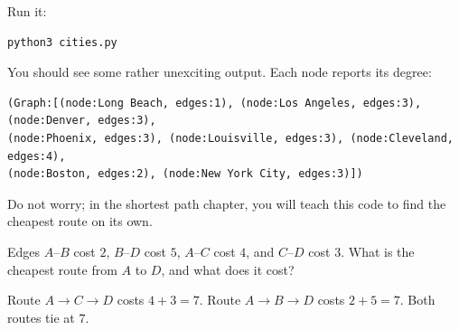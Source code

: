 Run it:
\begin{verbatim}
python3 cities.py
\end{verbatim}

You should see some rather unexciting output. Each node reports its
degree:

\begin{verbatim}
(Graph:[(node:Long Beach, edges:1), (node:Los Angeles, edges:3), (node:Denver, edges:3),
(node:Phoenix, edges:3), (node:Louisville, edges:3), (node:Cleveland, edges:4),
(node:Boston, edges:2), (node:New York City, edges:3)])
\end{verbatim}

Do not worry; in the shortest path chapter, you will teach this code to
find the cheapest route on its own.

\begin{Exercise}[title={Cheapest Route}, label=graph1]
Edges $A$--$B$ cost $2$, $B$--$D$ cost $5$, $A$--$C$ cost $4$, and $C$--$D$ cost $3$. What is the cheapest route from $A$ to $D$, and what does it cost?
\end{Exercise}
\begin{Answer}[ref=graph1]
Route $A \to C \to D$ costs $4 + 3 = 7$. Route $A \to B \to D$ costs $2 + 5 = 7$. Both routes tie at $7$.
\end{Answer}
